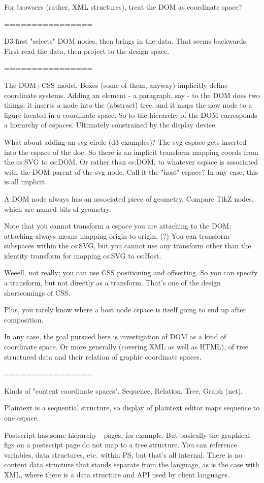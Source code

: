 \documentclass[reqno,12pt]{tufte-handout}
\numberwithin{equation}{subsection}
\numberwithin{equation}{subsection}
\begin{document}
For browsers (rather, XML structures), treat the DOM as coordinate
space?

================

D3 first "selects" DOM nodes, then brings in the data.  That seems
backwards.  First read the data, then project to the design space.

================

The DOM+CSS model.  Boxes (some of them, anyway) implicitly define
coordinate systems.  Adding an element - a paragraph, say - to the DOM
does two things: it inserts a node into the (abstract) tree, and it
maps the new node to a figure located in a coordinate space.  So to
the hierarchy of the DOM corresponds a hierarchy of cspaces.
Ultimately constrained by the display device.

What about adding an svg circle (d3 examples)?  The svg cspace gets
inserted into the cspace of the doc.  So there is an implicit
transform mapping coords from the cs:SVG to cs:DOM. Or rather than
cs:DOM, to whatever cspace is associated with the DOM parent of the
svg node.  Call it the "host" cspace?  In any case, this is all
implicit.

A DOM node always has an associated piece of geometry.  Compare TikZ
nodes, which are named bits of geometry.

Note that you cannot transform a cspace you are attaching to the DOM;
attaching always means mapping origin to origin. (?)  You can
transform subspaces within the cs:SVG, but you cannot use any
transform other than the identity transform for mapping cs:SVG to
cs:Host.

Weeell, not really; you can use CSS positioning and offsetting.  So
you can specify a transform, but not directly as a transform.  That's
one of the design shortcomings of CSS.

Plus, you rarely know where a host node cspace is itself going to end
up after composition.

In any case, the goal pursued here is investigation of DOM as a kind
of coordinate space.  Or more generally (covering XML as well as
HTML), of tree structured data and their relation of graphic
coordinate spaces.


================

Kinds of "content coordinate spaces".  Sequence, Relation, Tree, Graph
(net).  

Plaintext is a sequential structure, so display of plaintext editor
maps sequence to one cspace.

Postscript has some hierarchy - pages, for example.  But basically the
graphical figs on a postscript page do not map to a tree structure.
You can reference variables, data structures, etc. within PS, but
that's all internal.  There is no content data structure that stands
separate from the language, as is the case with XML, where there is a
data structure and API used by client languages.
\end{document}
